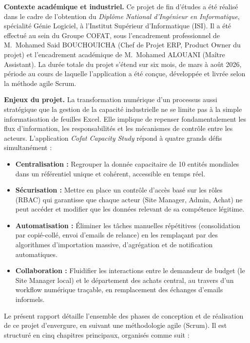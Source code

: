 \medskip
\noindent\textbf{Contexte académique et industriel.}
Ce projet de fin d'études a été réalisé dans le cadre de l'obtention du \textit{Diplôme National d'Ingénieur en Informatique}, spécialité Génie Logiciel, à l'Institut Supérieur d'Informatique (ISI). Il a été effectué au sein du Groupe COFAT, sous l'encadrement professionnel de M.~Mohamed Said BOUCHOUICHA (Chef de Projet ERP, Product Owner du projet) et l'encadrement académique de M.~Mohamed ALOUANI (Maître Assistant). La durée totale du projet s'étend sur six mois, de mars à août 2026, période au cours de laquelle l'application a été conçue, développée et livrée selon la méthode agile Scrum.

\medskip
\noindent\textbf{Enjeux du projet.}
La transformation numérique d'un processus aussi stratégique que la gestion de la capacité industrielle ne se limite pas à la simple informatisation de feuilles Excel. Elle implique de repenser fondamentalement les flux d'information, les responsabilités et les mécanismes de contrôle entre les acteurs. L'application \textit{Cofat Capacity Study} répond à quatre grands défis simultanément :
\begin{itemize}
    \item \textbf{Centralisation :} Regrouper la donnée capacitaire de 10 entités mondiales dans un référentiel unique et cohérent, accessible en temps réel.
    \item \textbf{Sécurisation :} Mettre en place un contrôle d'accès basé sur les rôles (RBAC) qui garantisse que chaque acteur (Site Manager, Admin, Achat) ne peut accéder et modifier que les données relevant de sa compétence légitime.
    \item \textbf{Automatisation :} Éliminer les tâches manuelles répétitives (consolidation par copié-collé, envoi d'emails de relance) en les remplaçant par des algorithmes d'importation massive, d'agrégation et de notification automatiques.
    \item \textbf{Collaboration :} Fluidifier les interactions entre le demandeur de budget (le Site Manager local) et le département des achats central, au travers d'un workflow numérique traçable, en remplacement des échanges d'emails informels.
\end{itemize}

\medskip

Le présent rapport détaille l'ensemble des phases de conception et de réalisation de ce projet d'envergure, en suivant une méthodologie agile (Scrum). Il est structuré en cinq chapitres principaux, organisés comme suit :

